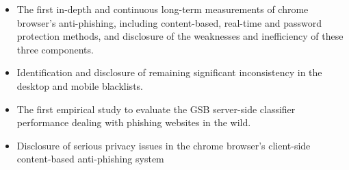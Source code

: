 \begin{itemize}
    \item The first in-depth and continuous long-term measurements of chrome browser's anti-phishing, including content-based, real-time and password protection methods, and disclosure of the weaknesses and inefficiency of these three components.
    \item Identification and disclosure of remaining significant inconsistency in the desktop and mobile blacklists.
    \item The first empirical study to evaluate the GSB server-side classifier performance dealing with phishing websites in the wild.
    \item Disclosure of serious privacy issues in the chrome browser's client-side content-based anti-phishing system
\end{itemize}





 

